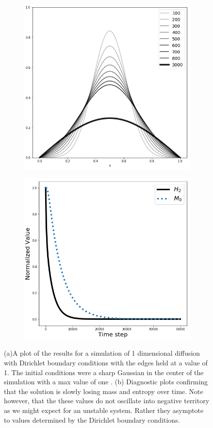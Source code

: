\documentclass[]{article}
\begin{document}
\begin{figure}
	\begin{subfigure}{.5\textwidth}
		\centering
		\includegraphics[width=.8\linewidth]{figures/1D_Diffusion_DirBound0.png}
		\caption{}
	\end{subfigure}%
	\begin{subfigure}{.5\textwidth}
		\centering
		\includegraphics[width=.8\linewidth]{figures/1D_Diffusion_DirBound0_diag.png}
		\caption{}
	\end{subfigure}
	\caption{(a)A plot of the results for a simulation of 1 dimensional diffusion with Dirichlet boundary conditions with the edges held at a value of 1. The initial conditions were a sharp Gaussian in the center of the simulation with a max value of one . (b) Diagnostic plots confirming that the solution is slowly losing mass and entropy over time. Note however, that the these values do not oscillate into negative territory as we might expect for an unstable system. Rather they asymptote to values determined by the Dirichlet boundary conditions.}
	\label{fig:1D_diffu_diri0}
\end{figure}
\end{document}
